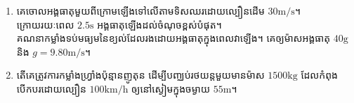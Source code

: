 \begin{enumerate}
\begin{figure}[H]
		\centering
	\end{figure}
	\item គេចោលអង្គធាតុមួយពីក្រោមឡើងទៅលើតាមទិសឈរដោយល្បឿនដើម $30\si{\metre/\second}$។\\ ក្រោយរយៈពេល $2.5\si{\second}$ អង្គធាតុឡើងដល់ចំណុចខ្ពស់បំផុត។\\ គណនាកម្លាំងទប់មធ្យមនៃខ្យល់ដែលរងដោយអង្គធាតុក្នុងពេលវាឡើង។ គេឲ្យម៉ាសអង្គធាតុ $40\si{\gram}$ និង $g=9.80\si{\metre/\second}$។
	\item តើគេត្រូវការកម្លាំង​ហ្រ្វាំងប៉ុន្មានញូតុន ដើម្បីបញ្ឈប់រថយន្តមួយមានម៉ាស $1500\si{\kilogram}$ ដែលកំពុងបើកបរដោយល្បឿន $100\si{\kilo\metre/\hour}$ ឲ្យនៅស្ងៀមក្នុងចម្ងាយ $55\si{\metre}$។
\end{enumerate}
